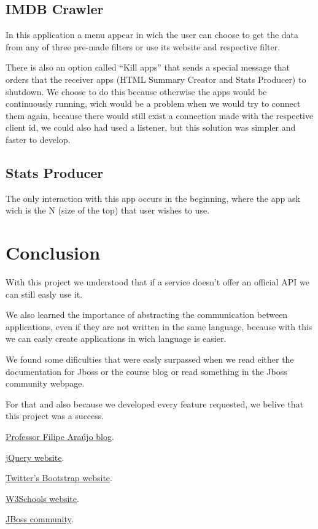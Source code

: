 \documentclass[12pt]{article}
\begin{document}
\subsection{IMDB Crawler}
\indent \indent In this application a menu appear in wich the user can choose to get the data from any of three pre-made filters or use its website and respective filter.

There is also an option called ``Kill apps'' that sends a special message that orders that the receiver apps (HTML Summary Creator and Stats Producer) to shutdown. We choose to do this because otherwise the apps would be continuously running, wich would be a problem when we would try to connect them again, because there would still exist a connection made with the respective client id, we could also had used a listener, but this solution was simpler and faster to develop.

\subsection{Stats Producer}
\indent \indent The only interaction with this app occurs in the beginning, where the app ask wich is the N (size of the top) that user wishes to use.

\clearpage
\section{Conclusion}
\indent \indent With this project we understood that if a service doesn't offer an official API we can still easly use it.

We also learned the importance of abstracting the communication between applications, even if they are not written in the same language, because with this we can easly create applications in wich language is easier.

We found some dificulties that were easly surpassed when we read either the documentation for Jboss or the course blog or read something in the Jboss community webpage.

For that and also because we developed every feature requested, we belive that this project was a success.

\clearpage
\begin{thebibliography}{9}
	\href{http://eai-course.blogspot.pt/}{Professor Filipe Araújo blog}.

	\href{http://jquery.com/}{jQuery website}.

	\href{http://getbootstrap.com/}{Twitter's Bootstrap website}.

	\href{http://www.w3schools.com/}{W3Schools website}.
	
	\href{https://community.jboss.org/}{JBoss community}.
\end{thebibliography}
\end{document}
